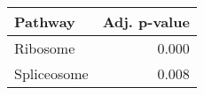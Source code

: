 \begin{tabular}{lr}
\toprule
     Pathway &  Adj. p-value \\
\midrule
    Ribosome &         0.000 \\
 Spliceosome &         0.008 \\
\bottomrule
\end{tabular}
